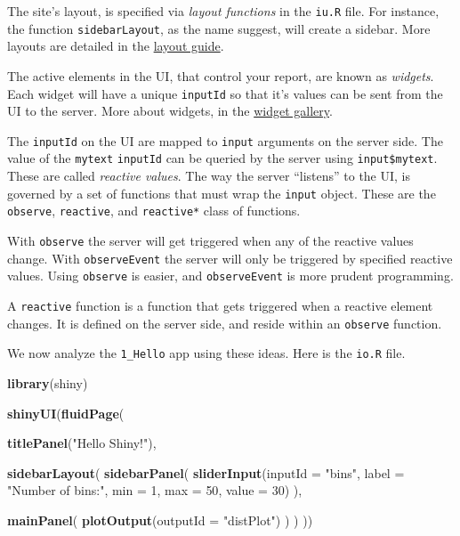 \documentclass[]{book}
\newenvironment{Shaded}{\begin{snugshade}}{\end{snugshade}}
\newcommand{\KeywordTok}[1]{\textcolor[rgb]{0.13,0.29,0.53}{\textbf{#1}}}
\newcommand{\DataTypeTok}[1]{\textcolor[rgb]{0.13,0.29,0.53}{#1}}
\newcommand{\DecValTok}[1]{\textcolor[rgb]{0.00,0.00,0.81}{#1}}
\newcommand{\StringTok}[1]{\textcolor[rgb]{0.31,0.60,0.02}{#1}}
\newcommand{\NormalTok}[1]{#1}
\theoremstyle{definition}
\theoremstyle{definition}
\theoremstyle{definition}
\theoremstyle{remark}
\begin{document}
The site's layout, is specified via \emph{layout functions} in the
\texttt{iu.R} file. For instance, the function \texttt{sidebarLayout},
as the name suggest, will create a sidebar. More layouts are detailed in
the \href{http://shiny.rstudio.com/articles/layout-guide.html}{layout
guide}.

The active elements in the UI, that control your report, are known as
\emph{widgets}. Each widget will have a unique \texttt{inputId} so that
it's values can be sent from the UI to the server. More about widgets,
in the
\href{http://shiny.rstudio.com/gallery/widget-gallery.html}{widget
gallery}.

The \texttt{inputId} on the UI are mapped to \texttt{input} arguments on
the server side. The value of the \texttt{mytext} \texttt{inputId} can
be queried by the server using \texttt{input\$mytext}. These are called
\emph{reactive values}. The way the server ``listens'' to the UI, is
governed by a set of functions that must wrap the \texttt{input} object.
These are the \texttt{observe}, \texttt{reactive}, and
\texttt{reactive*} class of functions.

With \texttt{observe} the server will get triggered when any of the
reactive values change. With \texttt{observeEvent} the server will only
be triggered by specified reactive values. Using \texttt{observe} is
easier, and \texttt{observeEvent} is more prudent programming.

A \texttt{reactive} function is a function that gets triggered when a
reactive element changes. It is defined on the server side, and reside
within an \texttt{observe} function.

We now analyze the \texttt{1\_Hello} app using these ideas. Here is the
\texttt{io.R} file.

\begin{Shaded}
\begin{Highlighting}[]
\KeywordTok{library}\NormalTok{(shiny)}

\KeywordTok{shinyUI}\NormalTok{(}\KeywordTok{fluidPage}\NormalTok{(}

  \KeywordTok{titlePanel}\NormalTok{(}\StringTok{"Hello Shiny!"}\NormalTok{),}

  \KeywordTok{sidebarLayout}\NormalTok{(}
    \KeywordTok{sidebarPanel}\NormalTok{(}
      \KeywordTok{sliderInput}\NormalTok{(}\DataTypeTok{inputId =} \StringTok{"bins"}\NormalTok{,}
                  \DataTypeTok{label =} \StringTok{"Number of bins:"}\NormalTok{, }
                  \DataTypeTok{min =} \DecValTok{1}\NormalTok{,}
                  \DataTypeTok{max =} \DecValTok{50}\NormalTok{,}
                  \DataTypeTok{value =} \DecValTok{30}\NormalTok{)}
\NormalTok{    ),}

    \KeywordTok{mainPanel}\NormalTok{(}
      \KeywordTok{plotOutput}\NormalTok{(}\DataTypeTok{outputId =} \StringTok{"distPlot"}\NormalTok{)}
\NormalTok{    )}
\NormalTok{  )}
\NormalTok{))}
\end{Highlighting}
\end{Shaded}
\end{document}
